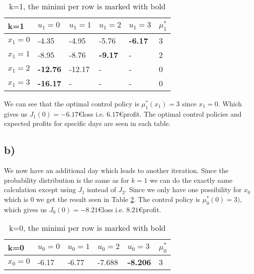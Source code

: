 \documentclass{article}
\begin{document}
\begin{table}[h]
	\centering
	\caption{k=1, the minimi per row is marked with bold}
	\label{tab:k1}
	\begin{tabular}{l|llll|l}
		k=1     & $u_1=0$         & $u_1=1$ & $u_1=2$        & $u_1=3$        & $\mu_1^*$ \\ \hline
		$x_1=0$ & -4.35           & -4.95   & -5.76          & \textbf{-6.17} & 3         \\
		$x_1=1$ & -8.95           & -8.76   & \textbf{-9.17} &        -        & 2         \\
		$x_1=2$ & \textbf{-12.76} & -12.17  &   -             &        -        & 0         \\
		$x_1=3$ & \textbf{-16.17} &   -      &      -          &       -         & 0        
	\end{tabular}
\end{table}
We can see that the optimal control policy is $\mu_1^*(x_1) = 3$ since $x_1=0$. Which gives us $J_1(0) = -6.17$\euro loss i.e. $6.17$\euro profit. The optimal control policies and expected profits for specific days are seen in each table.


\subsection*{b)}
We now have an additional day which leads to another iteration. Since the probability distribution is the same as for $k=1$ we can do the exactly same calculation except using $J_1$ isntead of $J_2$. Since we only have one possibility for $x_0$ which is $0$ we get the result seen in Table \ref{tab:k0}. The control policy is $\mu_0^*(0) = 3)$, which gives us $J_0(0) = -8.21$\euro loss i.e. $8.21$\euro profit.

\begin{table}[h]
	\centering
	\caption{k=0, the minimi per row is marked with bold}
	\label{tab:k0}
	\begin{tabular}{l|llll|l}
		k=0     & $u_0=0$         & $u_0=1$ & $u_0=2$        & $u_0=3$         & $\mu_0^*$ \\ \hline
		$x_0=0$ & -6.17           & -6.77   & -7.688         & \textbf{-8.206} & 3     
	\end{tabular}
\end{table}
\end{document}
